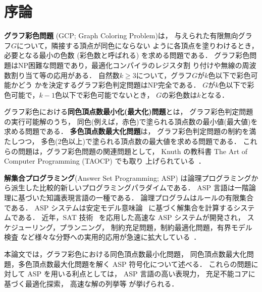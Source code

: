 \chapter{序論}

\textbf{グラフ彩色問題} (GCP; Graph Coloring Problem)は，
与えられた有限無向グラフ$G$について，隣接する頂点が同色にならない
ように各頂点を塗りわけるとき，必要となる最小の色数 (彩色数と呼ばれる)
を求める問題である．
グラフ彩色問題はNP困難な問題であり，最適化コンパイラのレジスタ割
り付けや無線の周波数割り当て等の応用がある．
自然数$k\geq 3$について，グラフ$G$が$k$色以下で彩色可能かどう
かを決定するグラフ彩色判定問題はNP完全である．
$G$が$k$色以下で彩色可能で，$k-1$色以下で彩色可能でないとき，
$G$の彩色数は$k$となる．

グラフ彩色における\textbf{同色頂点数最小化(最大化)問題}とは，
グラフ彩色判定問題の実行可能解のうち，
同色(例えば，赤色)で塗られる頂点数の最小値(最大値)を求める問題である．
\textbf{多色頂点数最大化問題}は，
グラフ彩色判定問題の制約を満たしつつ，
多色(2色以上)で塗られる頂点数の最大値を求める問題である．
これらの問題は，グラフ彩色問題の関連問題として，
Knuth の教科書 The Art of Computer Programming (TAOCP) でも取り
上げられている~\cite{Knuth:TAOCP:SAT}．

\textbf{解集合プログラミング}(Answer Set Programming; ASP\cite{%
  Baral03:cambridge,%
  Gelfond88:iclp,%
  Inoue08:jssst,%
  Niemela99:amai})
は論理プログラミングから派生した比較的新しいプログラミングパラダイムである．
ASP 言語は一階論理に基づいた知識表現言語の一種である．
論理プログラムはルールの有限集合である．
ASP システムは安定モデル意味論~\cite{Gelfond88:iclp}
に基づく解集合を計算するシステムである．
近年，SAT 技術~\cite{JSAI:InoueT10}
を応用した高速な ASP システムが開発され，
スケジューリング，プランニング，
制約充足問題，制約最適化問題，有界モデル検査
など様々な分野への実用的応用が急速に拡大している~\cite{ergele16a,anor/Banbara2019}．

本論文では，グラフ彩色における同色頂点数最小化問題，
同色頂点数最大化問題，多色頂点数最大化問題を解く
ASP 符号化について述べる．
これらの問題に対して ASP を用いる利点としては，
ASP 言語の高い表現力，
充足不能コアに基づく最適化探索，
高速な解の列挙等
が挙げられる．


